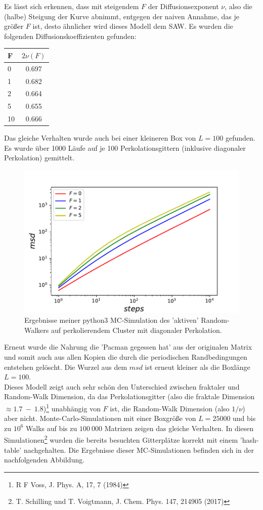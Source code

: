 \documentclass[a4paper, 12pt]{scrartcl}
\begin{document}
\noindent Es lässt sich erkennen, dass mit steigendem $F$ der Diffusionsexponent $\nu$, also die (halbe) Steigung der Kurve abnimmt, entgegen der naiven Annahme, das je größer $F$ ist, desto ähnlicher wird dieses Modell dem SAW.
Es wurden die folgenden Diffusionskoeffizienten gefunden:

\begin{tabular}[h]{l|c}
F & $2\nu(F)$\\
\hline
0 & 0.697\\
1 & 0.682\\
2 & 0.664\\
5 & 0.655\\
10 & 0.666\\
\end{tabular}

\noindent Das gleiche Verhalten wurde auch bei einer kleineren Box von $L=100$ gefunden. Es wurde über 1000 Läufe auf je 100 Perkolationsgittern (inklusive diagonaler Perkolation) gemittelt.
\begin{figure}[h!]
	\centering
	\includegraphics[scale=0.9]{newfood.pdf}
	\caption{Ergebnisse meiner python3 MC-Simulation des 'aktiven' Random-Walkers auf perkolierendem Cluster mit diagonaler Perkolation.}
\end{figure}
\newpage 
\noindent Erneut wurde die Nahrung die 'Pacman gegessen hat' aus der originalen Matrix und somit auch aus allen Kopien die durch die periodischen Randbedingungen entstehen gelöscht. Die Wurzel aus dem $msd$ ist erneut kleiner als die Boxlänge $L=100$.\\
\noindent Dieses Modell zeigt auch sehr schön den Unterschied zwischen fraktaler und Random-Walk Dimension, da das Perkolationsgitter (also die fraktale Dimension $\approx 1.7\ -\ 1.8$)\footnote[9]{R F Voss, J. Phys. A, 17, 7 (1984)} unabhängig von $F$ ist, die Random-Walk Dimension (also $1/\nu$) aber nicht.
\newpage
\noindent Monte-Carlo-Simulationen mit einer Boxgröße von $L=25000$ und bis zu $10^6$ Walks auf bis zu $100\ 000$ Matrizen zeigen das gleiche Verhalten. In diesen Simulationen\footnote[8]{T. Schilling und T. Voigtmann, J. Chem. Phys. 147, 214905 (2017)} wurden die bereits besuchten Gitterplätze korrekt mit einem 'hash-table' nachgehalten. Die Ergebnisse dieser MC-Simulationen befinden sich in der nachfolgenden Abbildung.
\end{document}
